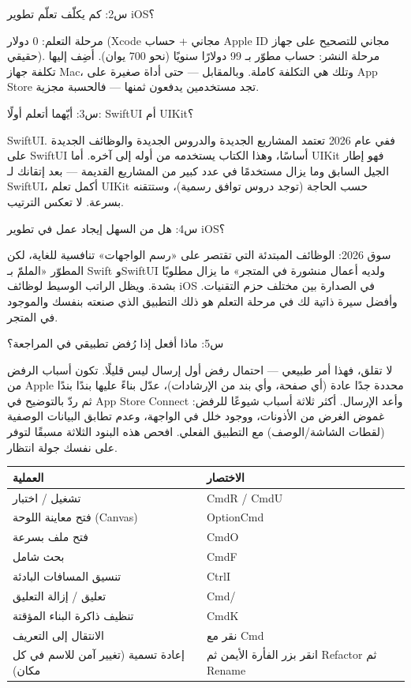 س2: كم يكلّف تعلّم تطوير iOS؟

مرحلة التعلم: 0 دولار (Xcode مجاني + حساب Apple ID مجاني للتصحيح على جهاز حقيقي). مرحلة النشر: حساب مطوّر بـ 99 دولارًا سنويًا (نحو 700 يوان). أضِف إليها تكلفة جهاز Mac، وتلك هي التكلفة كاملة. وبالمقابل — حتى أداة صغيرة على App Store تجد مستخدمين يدفعون ثمنها — فالحسبة مجزية.

س3: أيّهما أتعلم أولًا: SwiftUI أم UIKit؟

SwiftUI. ففي عام 2026 تعتمد المشاريع الجديدة والدروس الجديدة والوظائف الجديدة على SwiftUI أساسًا، وهذا الكتاب يستخدمه من أوله إلى آخره. أما UIKit فهو إطار الجيل السابق وما يزال مستخدمًا في عدد كبير من المشاريع القديمة — بعد إتقانك لـ SwiftUI، أكمل تعلم UIKit حسب الحاجة (توجد دروس توافق رسمية)، وستتقنه بسرعة. لا تعكس الترتيب.

س4: هل من السهل إيجاد عمل في تطوير iOS؟

سوق 2026: الوظائف المبتدئة التي تقتصر على «رسم الواجهات» تنافسية للغاية، لكن المطوّر «الملمّ بـ Swift وSwiftUI ولديه أعمال منشورة في المتجر» ما يزال مطلوبًا بشدة. ويظل الراتب الوسيط لوظائف iOS في الصدارة بين مختلف حزم التقنيات. وأفضل سيرة ذاتية لك في مرحلة التعلم هو ذلك التطبيق الذي صنعته بنفسك والموجود في المتجر.

س5: ماذا أفعل إذا رُفض تطبيقي في المراجعة؟

لا تقلق، فهذا أمر طبيعي — احتمال رفض أول إرسال ليس قليلًا. تكون أسباب الرفض من Apple محددة جدًا عادة (أي صفحة، وأي بند من الإرشادات)، عدّل بناءً عليها بندًا بندًا ثم ردّ بالتوضيح في App Store Connect وأعد الإرسال. أكثر ثلاثة أسباب شيوعًا للرفض: غموض الغرض من الأذونات، ووجود خلل في الواجهة، وعدم تطابق البيانات الوصفية (لقطات الشاشة/الوصف) مع التطبيق الفعلي. افحص هذه البنود الثلاثة مسبقًا لتوفر على نفسك جولة انتظار.


\begin{center}
\begin{tabularx}{\linewidth}{|X|X|}
\hline
\textbf{العملية} & \textbf{الاختصار} \tabularnewline
\hline
تشغيل / اختبار & CmdR / CmdU \tabularnewline
فتح معاينة اللوحة (Canvas) & OptionCmd \tabularnewline
فتح ملف بسرعة & CmdO \tabularnewline
بحث شامل & CmdF \tabularnewline
تنسيق المسافات البادئة & CtrlI \tabularnewline
تعليق / إزالة التعليق & Cmd/ \tabularnewline
تنظيف ذاكرة البناء المؤقتة & CmdK \tabularnewline
الانتقال إلى التعريف & نقر مع Cmd \tabularnewline
إعادة تسمية (تغيير آمن للاسم في كل مكان) & انقر بزر الفأرة الأيمن ثم Refactor ثم Rename \tabularnewline
\hline
\end{tabularx}
\end{center}

